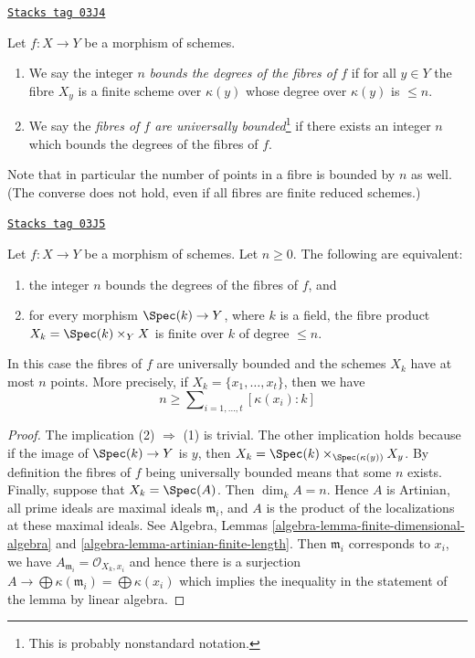 \begin{definition}
\label{morphisms-definition-universally-bounded}
\href{https://stacks.math.columbia.edu/tag/03J4}{\texttt{Stacks tag 03J4}}

Let $f : X \to Y$ be a morphism of schemes.
\begin{enumerate}
\item We say the integer $n$ {\it bounds the degrees of the fibres
of $f$} if for all $y \in Y$
the fibre $X_y$ is a finite scheme over $\kappa(y)$ whose
degree over $\kappa(y)$ is $\leq n$.
\item We say the {\it fibres of $f$ are universally bounded}\footnote{This is
probably nonstandard notation.}
if there exists an integer $n$ which bounds the degrees of the fibres
of $f$.
\end{enumerate}
\end{definition}

Note that in particular the number of points in a fibre is bounded by $n$
as well. (The converse does not hold, even if all fibres are finite reduced
schemes.)

\begin{lemma}
\label{morphisms-lemma-characterize-universally-bounded}
\href{https://stacks.math.columbia.edu/tag/03J5}{\texttt{Stacks tag 03J5}}

Let $f : X \to Y$ be a morphism of schemes. Let $n \geq 0$.
The following are equivalent:
\begin{enumerate}
\item the integer $n$ bounds the degrees of the fibres of $f$, and
\item for every morphism $\Spec(k) \to Y$, where $k$ is a field,
the fibre product $X_k = \Spec(k) \times_Y X$ is finite over $k$
of degree $\leq n$.
\end{enumerate}
In this case the fibres of $f$ are universally bounded and the schemes
$X_k$ have at most $n$ points. More precisely, if
$X_k = \{x_1, \ldots, x_t\}$, then we have
$$
n \geq \sum\nolimits_{i = 1, \ldots, t} [\kappa(x_i) : k]
$$
\end{lemma}

\begin{proof}
The implication (2) $\Rightarrow$ (1) is trivial. The other implication
holds because if the image of $\Spec(k) \to Y$ is $y$, then
$X_k = \Spec(k) \times_{\Spec(\kappa(y))} X_y$. By definition the
fibres of $f$ being universally bounded means that some $n$ exists.
Finally, suppose that $X_k = \Spec(A)$. Then $\dim_k A = n$.
Hence $A$ is Artinian, all prime ideals are maximal ideals $\mathfrak m_i$,
and $A$ is the product of the localizations at these maximal ideals.
See Algebra, Lemmas \ref{algebra-lemma-finite-dimensional-algebra}
and \ref{algebra-lemma-artinian-finite-length}. Then $\mathfrak m_i$
corresponds to $x_i$, we have
$A_{\mathfrak m_i} = \mathcal{O}_{X_k, x_i}$
and hence there is a surjection
$A \to  \bigoplus \kappa(\mathfrak m_i) = \bigoplus \kappa(x_i)$
which implies the inequality in the statement of the lemma
by linear algebra.
\end{proof}

